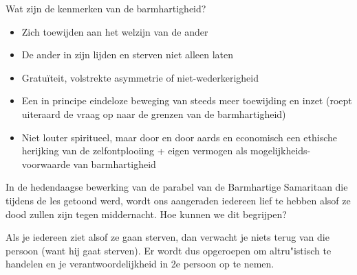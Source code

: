 \documentclass[main.tex]{subfiles}
\begin{document}
\begin{examenvraag}
    \begin{vraag}
        Wat zijn de kenmerken van de barmhartigheid?
    \end{vraag}

    \begin{antwoord}
    	\begin{itemize}
	    	\item Zich toewijden aan het welzijn van de ander
	    	\item De ander in zijn lijden en sterven niet alleen laten
	    	\item Gratuïteit, volstrekte asymmetrie of niet-wederkerigheid
	    	\item Een in principe eindeloze beweging van steeds meer toewijding en inzet (roept uiteraard de vraag op naar de grenzen van de barmhartigheid)
	    	\item Niet louter spiritueel, maar door en door aards en economisch een ethische herijking van de zelfontplooiing + eigen vermogen als mogelijkheids-voorwaarde van barmhartigheid
	    	
    	\end{itemize}
    \end{antwoord}
\end{examenvraag}


\begin{examenvraag}
    \begin{vraag}
        In de hedendaagse bewerking van de parabel van de Barmhartige Samaritaan die tijdens de les getoond werd, wordt ons aangeraden iedereen lief te hebben alsof ze dood zullen zijn tegen middernacht. Hoe kunnen we dit begrijpen?
    \end{vraag}

    \begin{antwoord}
		Als je iedereen ziet alsof ze gaan sterven, dan verwacht je niets terug van die persoon (want hij gaat sterven). Er wordt dus opgeroepen om altru"istisch te handelen en je verantwoordelijkheid in 2e persoon op te nemen.
    \end{antwoord}
\end{examenvraag}
\end{document}
